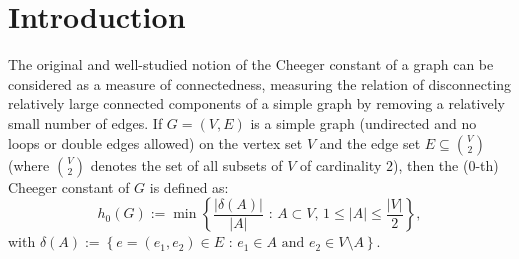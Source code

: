 
\chapter{Introduction}

\label{Introduction}

The original and well-studied notion of the Cheeger constant of a graph can be considered as a measure of connectedness, measuring the relation of disconnecting relatively large connected components of a simple graph by removing a relatively small number of edges. If \(G=(V,E)\) is a simple graph (undirected and no loops or double edges allowed) on the vertex set \(V\) and the edge set \(E\subseteq\binom{V}{2}\) (where \(\binom{V}{2}\) denotes the set of all subsets of \(V\) of cardinality \(2\)), then the (\(0\)-th) Cheeger constant of \(G\) is defined as:
\[
h_0(G):=\min\left\{\frac{\left|\delta(A)\right|}{\left|A\right|}\text{ : }A\subset V\text{, }1\leq\left|A\right|\leq\frac{\left|V\right|}{2}\right\},
\]
with \(\delta(A):=\left\{e=(e_1,e_2)\in E\text{ : }e_1\in A\text{ and }e_2\in V\setminus A\right\}\).\\
